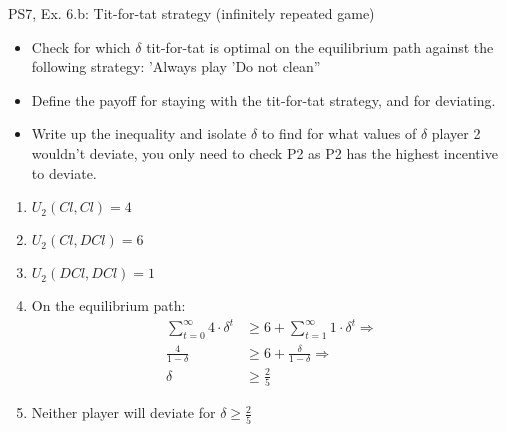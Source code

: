 \begin{frame}{PS7, Ex. 6.b: Tit-for-tat strategy (infinitely repeated game)}
    \begin{itemize}
    \item[(b)] Check for which $\delta$ tit-for-tat is optimal on the equilibrium path against the following strategy: ’Always play ’Do not clean”
    \end{itemize}
  \begin{multicols}{2}
  \begin{itemize}
      \item[(Step a)] Define the payoff for staying with the tit-for-tat strategy, and for deviating.
      \item[(Step b)] Write up the inequality and isolate $\delta$ to find for what values of $\delta$ player 2 wouldn't deviate, you only need to check P2 as P2 has the highest incentive to deviate.
  \end{itemize}
    \vfill\null\columnbreak
    \begin{enumerate}
        \item $U_2(Cl,Cl) = 4$
        \item $U_2(Cl,DCl) = 6$
        \item $U_2(DCl,DCl) = 1$
        \item On the equilibrium path:
        \begin{align*}
            \sum_{t=0}^{\infty} 4\cdot\delta^{t}&\geq6 + \sum_{t=1}^{\infty} 1\cdot\delta^{t}\Rightarrow\\
            \frac{4}{1-\delta} &\geq 6 + \frac{\delta}{1-\delta}\Rightarrow\\
            \delta &\geq \frac{2}{5}
        \end{align*}
        \item Neither player will deviate for $\delta \geq \frac{2}{5}$
    \end{enumerate}
    \vfill\null
  \end{multicols}
\end{frame}

